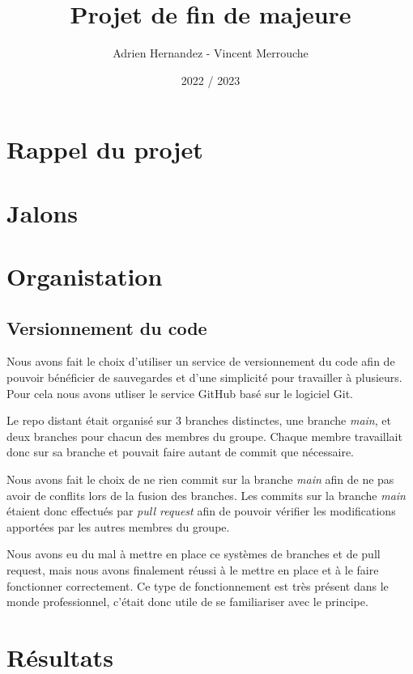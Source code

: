\documentclass{article}
\title{Projet de fin de majeure}
\author{Adrien Hernandez - Vincent Merrouche}
\date{2022 / 2023}
\begin{document}
\maketitle

\section{Rappel du projet}

\section{Jalons}

\section{Organistation}

\subsection{Versionnement du code}
Nous avons fait le choix d'utiliser un service de versionnement du code afin de pouvoir bénéficier de sauvegardes et d'une simplicité pour travailler à plusieurs. Pour cela nous avons utliser le service GitHub basé sur le logiciel Git. 

Le repo distant était organisé sur 3 branches distinctes, une branche \textit{main}, et deux branches pour chacun des membres du groupe. Chaque membre travaillait donc sur sa branche et pouvait faire autant de commit que nécessaire. 

Nous avons fait le choix de ne rien commit sur la branche \textit{main} afin de ne pas avoir de conflits lors de la fusion des branches. Les commits sur la branche \textit{main} étaient donc effectués par \textit{pull request} afin de pouvoir vérifier les modifications apportées par les autres membres du groupe.

Nous avons eu du mal à mettre en place ce systèmes de branches et de pull request, mais nous avons finalement réussi à le mettre en place et à le faire fonctionner correctement. Ce type de fonctionnement est très présent dans le monde professionnel, c'était donc utile de se familiariser avec le principe.


\section{Résultats}
\end{document}
